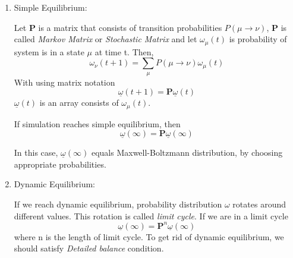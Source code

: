 \documentclass[12pt,fleqn]{report}
\begin{document}
\begin{enumerate}

\item Simple Equilibrium:

Let \textbf{P} is a matrix that consists of transition probabilities $P(\mu \rightarrow \nu)$, \textbf{P} is called \textit{Markov Matrix} or \textit{Stochastic Matrix} and let $\omega_\mu(t)$ is probability of system is in a state $\mu$ at time t. Then,
$$
 \omega_\nu(t+1) = \sum\limits_{\mu} P(\mu \rightarrow \nu) \omega_\mu(t) 
$$
With using matrix notation 
\begin{equation}
 \underline{\omega}(t+1) = \textbf{P} \underline{\omega}(t)
\end{equation}
$\underline{\omega}(t) $ is an array consists of $\omega_\mu(t)$. 

If simulation reaches simple equilibrium, then 
\begin{equation}
\underline{\omega}(\infty) = \textbf{P} \underline{\omega}(\infty) 
\end{equation}

In this case, $\underline{\omega}(\infty)$ equals Maxwell-Boltzmann distribution, by choosing appropriate probabilities.

\item Dynamic Equilibrium:

If we reach dynamic equilibrium, probability distribution $\omega$ rotates around different values. This rotation is called \textit{limit cycle}. If we are in a limit cycle 
\begin{equation}
\underline{\omega}(\infty) = \textbf{P}^n \underline{\omega}(\infty) 
\end{equation}
where n is the length of limit cycle. To get rid of dynamic equilibrium, we should satisfy \textit{Detailed balance} condition.

\end{enumerate}
\end{document}
